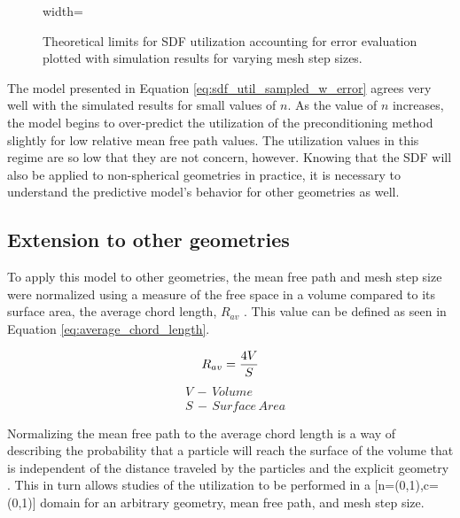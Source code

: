 \begin{figure}[H]
  \centering
  {width=\textwidth}
  \caption[Preconditioner utilization model accounting for interpolation
    error.]{Theoretical limits for SDF utilization accounting for error
    evaluation plotted with simulation results for varying mesh step sizes.}
  \label{fig:sdf_util_sampled_distance_w_error}
\end{figure}

The model presented in Equation \eqref{eq:sdf_util_sampled_w_error} agrees very
well with the simulated results for small values of $n$. As the value of $n$
increases, the model begins to over-predict the utilization of the
preconditioning method slightly for low relative mean free path values. The
utilization values in this regime are so low that they are not concern,
however. Knowing that the SDF will also be applied to non-spherical geometries
in practice, it is necessary to understand the predictive model's behavior for
other geometries as well.

\subsection{Extension to other geometries}\label{sec:sdf_other_geoms}

To apply this model to other geometries, the mean free path and mesh step size
were normalized using a measure of the free space in a volume compared to its
surface area, the average chord length, $R_{av}$ \cite{Wigner_1981}.  This value
can be defined as seen in Equation \eqref{eq:average_chord_length}.

\begin{equation}
\centering
 R_{av} = \frac{4V}{S}
 \label{eq:average_chord_length}
\end{equation}
\begin{align*}
 &V \, - \, Volume \\
 &S \, - \, Surface \, Area
\end{align*}

Normalizing the mean free path to the average chord length is a way of
describing the probability that a particle will reach the surface of the volume
that is independent of the distance traveled by the particles and the explicit
geometry \cite{Mazzolo_2014}. This in turn allows studies of the utilization to
be performed in a [n=(0,1),c=(0,1)] domain for an arbitrary geometry, mean free
path, and mesh step size.

